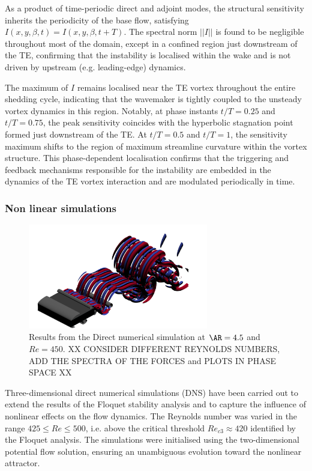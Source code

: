 As a product of time-periodic direct and adjoint modes, the structural sensitivity inherits the periodicity of the base flow, satisfying $I(x,y,\beta,t) = I (x,y,\beta,t+T)$. The spectral norm $||I||$ is found to be negligible throughout most of the domain, except in a confined region just downstream of the TE, confirming that the instability is localised within the wake and is not driven by upstream (e.g. leading-edge) dynamics.

The maximum of $I$ remains localised near the TE vortex throughout the entire shedding cycle, indicating that the wavemaker is tightly coupled to the unsteady vortex dynamics in this region. Notably, at phase instants $t/T=0.25$ and $t/T=0.75$, the peak sensitivity coincides with the hyperbolic stagnation point formed just downstream of the TE. At $t/T=0.5$ and $t/T=1$, the sensitivity maximum shifts to the region of maximum streamline curvature within the vortex structure. This phase-dependent localisation confirms that the triggering and feedback mechanisms responsible for the instability are embedded in the dynamics of the TE vortex interaction and are modulated periodically in time.

\subsubsection{Non linear simulations}

\begin{figure}
  \centering
  \includegraphics[width=0.7\textwidth]{./fig/AR4p5/lambda2_omegax-3D-Re450b.png}
  \caption{Results from the Direct numerical simulation at $\AR=4.5$ and $Re=450$. XX CONSIDER DIFFERENT REYNOLDS NUMBERS, ADD THE SPECTRA OF THE FORCES and PLOTS IN PHASE SPACE XX}
  \label{fig:dns-ar4p5}
\end{figure}

Three-dimensional direct numerical simulations (DNS) have been carried out to extend the results of the Floquet stability analysis and to capture the influence of nonlinear effects on the flow dynamics. The Reynolds number was varied in the range $425 \le Re \le 500$, i.e. above the critical threshold $Re_{c3} \approx 420$ identified by the Floquet analysis. The simulations were initialised using the two-dimensional potential flow solution, ensuring an unambiguous evolution toward the nonlinear attractor.

